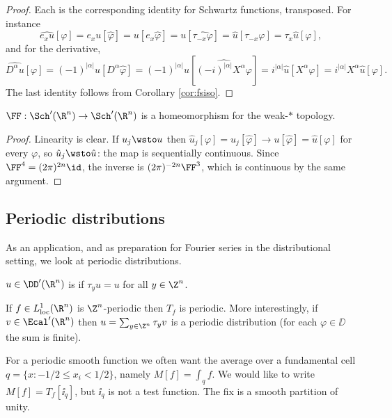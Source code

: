 \begin{proof}
	Each is the corresponding identity for Schwartz functions, transposed. For instance
	$$\widehat{e_xu}[\varphi]=e_xu[\hat\varphi]=u[e_x\hat\varphi]=u[\widehat{\tau_{-x}\varphi}]=\hat u[\tau_{-x}\varphi]=\tau_x\hat u[\varphi],$$
	and for the derivative,
	$$\widehat{D^\alpha u}[\varphi]=(-1)^{|\alpha|}u[D^\alpha\hat\varphi]=(-1)^{|\alpha|}u\!\left[\widehat{(-i)^{|\alpha|}X^\alpha\varphi}\right]=i^{|\alpha|}\hat u[X^\alpha\varphi]=i^{|\alpha|}X^\alpha\hat u[\varphi].$$
	The last identity follows from Corollary \ref{cor:fsiso}.
\end{proof}

\begin{lemma}
	$\FF : \Sch'(\R^n)\to\Sch'(\R^n)$ is a homeomorphism for the weak-$*$ topology.
\end{lemma}

\begin{proof}
	Linearity is clear. If $u_j\wsto u$ then $\hat u_j[\varphi]=u_j[\hat\varphi]\to u[\hat\varphi]=\hat u[\varphi]$ for every $\varphi$, so $\hat u_j\wsto\hat u$: the map is sequentially continuous. Since $\FF^4=(2\pi)^{2n}\id$, the inverse is $(2\pi)^{-2n}\FF^3$, which is continuous by the same argument.
\end{proof}

\subsection{Periodic distributions}

As an application, and as preparation for Fourier series in the distributional setting, we look at periodic distributions.

\begin{definition}
	$u \in \DD'(\R^n)$ is  if $\tau_yu=u$ for all $y\in\Z^n$.
\end{definition}

\begin{example}
	If $f\in L^1_{\mathrm{loc}}(\R^n)$ is $\Z^n$-periodic then $T_f$ is periodic. More interestingly, if $v \in \Ecal'(\R^n)$ then $u = \sum_{y\in\Z^n}\tau_yv$ is a periodic distribution (for each $\varphi\in\DD$ the sum is finite).
\end{example}

For a periodic smooth function we often want the average over a fundamental cell $q=\{x : -1/2\le x_i<1/2\}$, namely $M[f]=\int_qf$. We would like to write $M[f]=T_f[\ii_q]$, but $\ii_q$ is not a test function. The fix is a smooth partition of unity.

